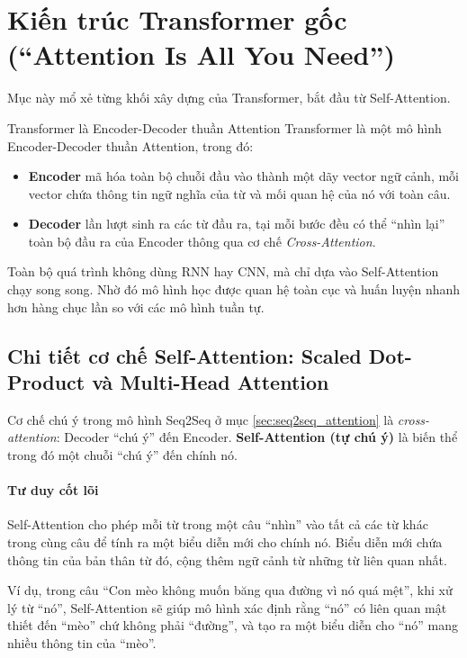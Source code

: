 
\section{Kiến trúc Transformer gốc (“Attention Is All You Need”)}
\label{sec:vanilla_transformer}

Mục này mổ xẻ từng khối xây dựng của Transformer, bắt đầu từ Self-Attention.

\begin{deepdive}{Transformer là Encoder-Decoder thuần Attention}
	Transformer là một mô hình Encoder-Decoder thuần Attention, trong đó:
	\begin{itemize}
		\item \textbf{Encoder} mã hóa toàn bộ chuỗi đầu vào thành một dãy vector ngữ cảnh, mỗi vector chứa thông tin ngữ nghĩa của từ và mối quan hệ của nó với toàn câu.
		\item \textbf{Decoder} lần lượt sinh ra các từ đầu ra, tại mỗi bước đều có thể “nhìn lại” toàn bộ đầu ra của Encoder thông qua cơ chế \textit{Cross-Attention}.
	\end{itemize}
	Toàn bộ quá trình không dùng RNN hay CNN, mà chỉ dựa vào Self-Attention chạy song song. Nhờ đó mô hình học được quan hệ toàn cục và huấn luyện nhanh hơn hàng chục lần so với các mô hình tuần tự.
\end{deepdive}

\subsection{Chi tiết cơ chế Self-Attention: Scaled Dot-Product và Multi-Head Attention}
\label{ssec:self_attention}

Cơ chế chú ý trong mô hình Seq2Seq ở mục \ref{sec:seq2seq_attention} là \textit{cross-attention}: Decoder “chú ý” đến Encoder. \textbf{Self-Attention (tự chú ý)} là biến thể trong đó một chuỗi “chú ý” đến chính nó.

\paragraph{Tư duy cốt lõi}
Self-Attention cho phép mỗi từ trong một câu “nhìn” vào tất cả các từ khác trong cùng câu để tính ra một biểu diễn mới cho chính nó. Biểu diễn mới chứa thông tin của bản thân từ đó, cộng thêm ngữ cảnh từ những từ liên quan nhất.

Ví dụ, trong câu “Con mèo không muốn băng qua đường vì nó quá mệt”, khi xử lý từ “nó”, Self-Attention sẽ giúp mô hình xác định rằng “nó” có liên quan mật thiết đến “mèo” chứ không phải “đường”, và tạo ra một biểu diễn cho “nó” mang nhiều thông tin của “mèo”.

